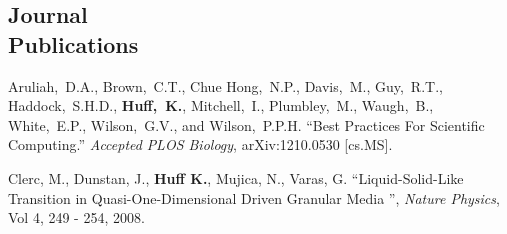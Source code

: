 \documentclass[margin,line]{resume}
\begin{document}
\begin{resume}
    \section{\mysidestyle Journal\\Publications}
      \begin{bibenum}
        \item Aruliah,~D.A., Brown,~C.T., Chue Hong,~N.P., Davis,~M., Guy,~R.T., 
          Haddock,~S.H.D., \textbf{Huff,~K.}, Mitchell,~I., Plumbley,~M., Waugh,~B., 
          White,~E.P., Wilson,~G.V., and Wilson,~P.P.H.  ``Best Practices For 
          Scientific Computing.''  \emph{Accepted} \textsl{PLOS Biology}, 
          arXiv:1210.0530 [cs.MS].
        \item Clerc, M., Dunstan, J., \textbf{Huff K.}, Mujica, N., Varas, G. 
          ``Liquid-Solid-Like Transition in Quasi-One-Dimensional Driven 
          Granular Media '',  \textsl{Nature Physics}, Vol 4, 249 - 254, 2008.
      \end{bibenum}

\end{resume}
\end{document}
